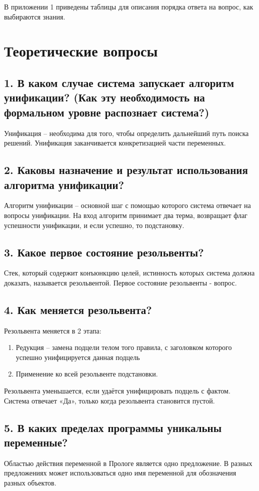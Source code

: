 В приложении 1 приведены таблицы для описания порядка ответа на вопрос, как выбираются знания.

\chapter*{Теоретические вопросы}

\section*{1. В каком случае система запускает алгоритм унификации? (Как эту необходимость на формальном уровне распознает система?)}
Унификация – необходима для того, чтобы определить дальнейший путь поиска решений. Унификация заканчивается конкретизацией части переменных.

\section*{2. Каковы назначение и результат использования алгоритма унификации?}
Алгоритм унификации – основной шаг с помощью которого система отвечает на вопросы унификации. 
На вход алгоритм принимает два терма, возвращает флаг успешности унификации, и если успешно, то подстановку.

\section*{3. Какое первое состояние резольвенты?}
Стек, который содержит конъюнкцию целей, истинность которых система должна доказать, называется
резольвентой. Первое состояние резольвенты - вопрос.

\section*{4. Как меняется резольвента?}
Резольвента меняется в 2 этапа:
\begin{enumerate}
	\item Редукция – замена подцели телом того правила, с заголовком которого успешно унифицируется данная подцель
	\item Применение ко всей резольвенте подстановки.
\end{enumerate}

Резольвента уменьшается, если удаётся унифицировать подцель с фактом. Система отвечает «Да», только
когда резольвента становится пустой.

\section*{5. В каких пределах программы уникальны переменные?}
Областью действия переменной в Прологе является одно предложение.
В разных предложениях может использоваться одно имя переменной для обозначения разных объектов.

